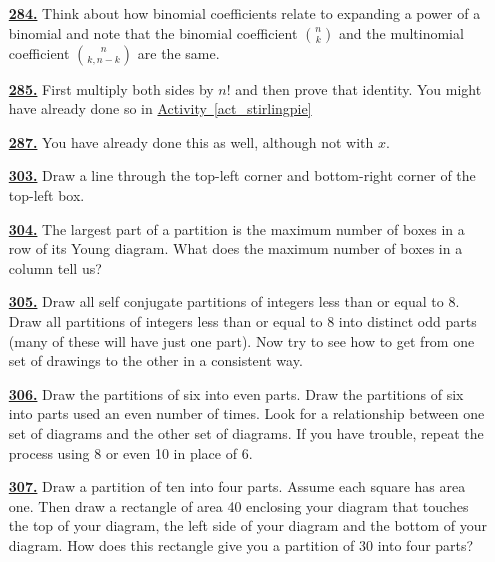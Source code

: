 \documentclass[10pt,]{book}
\theoremstyle{plain}
\theoremstyle{definition}
\theoremstyle{definition}
\theoremstyle{definition}
\numberwithin{equation}{chapter}
\begin{document}
\begin{itemize}[itemsep=1em]
\hypertarget{a-284}{}\item[\textbf{\hyperref[activity-277]{284.}}]
\hypertarget{p-1441}{}%
Think about how binomial coefficients relate to expanding a power of a binomial and note that the binomial coefficient \(\binom{n}{k}\) and the multinomial coefficient \(\binom{n}{k,n-k}\) are the same.%

\hypertarget{a-285}{}\item[\textbf{\hyperref[activity-278]{285.}}]
\hypertarget{p-1446}{}%
First multiply both sides by \(n!\) and then prove that identity.  You might have already done so in \hyperref[act_stirlingpie]{Activity~\ref{act_stirlingpie}}%

\hypertarget{a-287}{}\item[\textbf{\hyperref[activity-280]{287.}}]
\hypertarget{p-1454}{}%
You have already done this as well, although not with \(x\).%

\hypertarget{a-303}{}\item[\textbf{\hyperref[activity-296]{303.}}]
\hypertarget{p-1503}{}%
Draw a line through the top-left corner and bottom-right corner of the top-left box.%

\hypertarget{a-304}{}\item[\textbf{\hyperref[activity-297]{304.}}]
\hypertarget{p-1507}{}%
The largest part of a partition is the maximum number of boxes in a row of its Young diagram. What does the maximum number of boxes in a column tell us?%

\hypertarget{a-305}{}\item[\textbf{\hyperref[activity-298]{305.}}]
\hypertarget{p-1510}{}%
Draw all self conjugate partitions of integers less than or equal to 8.  Draw all partitions of integers less than or equal to 8 into distinct odd parts (many of these will have just one part). Now try to see how to get from one set of drawings to the other in a consistent way.%

\hypertarget{a-306}{}\item[\textbf{\hyperref[partition-even-mult-even-use]{306.}}]
\hypertarget{p-1514}{}%
Draw the partitions of six into even parts. Draw the partitions of six into parts used an even number of times. Look for a relationship between one set of diagrams and the other set of diagrams. If you have trouble, repeat the process using 8 or even 10 in place of 6.%

\hypertarget{a-307}{}\item[\textbf{\hyperref[rectanglecomplement]{307.}}]
\hypertarget{p-1517}{}%
Draw a partition of ten into four parts. Assume each square has area one. Then draw a rectangle of area 40 enclosing your diagram that touches the top of your diagram, the left side of your diagram and the bottom of your diagram. How does this rectangle give you a partition of 30 into four parts?%


\end{itemize}
\end{document}
